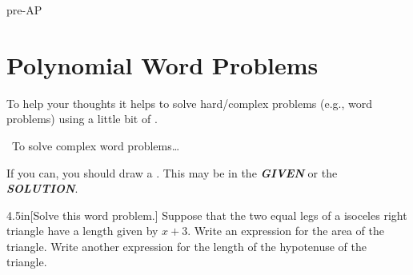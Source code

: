 \begin{taggedblock}{pre-AP}



\section{Polynomial Word Problems}

To help  your thoughts it helps to solve hard/complex problems 
(e.g., word problems) using a little bit of .

\begin{myConceptSteps}{~To solve complex word problems\dots}
\end{myConceptSteps}

\begin{myCenteredBox}[width=4.25in,before skip=-1.5em,]
    If you can, you should draw a .
    This may be in the {\bfseries\itshape GIVEN} or the {\bfseries\itshape SOLUTION}.
\end{myCenteredBox}



\vspace{-2em}
\begin{myWideProblem}{4.5in}[Solve this word problem.]
        {
            Suppose that the two equal legs of a isoceles right triangle 
            have a length given by {\large $x+3$}.
            Write an expression for the area of the triangle.
            Write another expression for the length of the hypotenuse of the triangle.    
        }
\end{myWideProblem}


\end{taggedblock}

